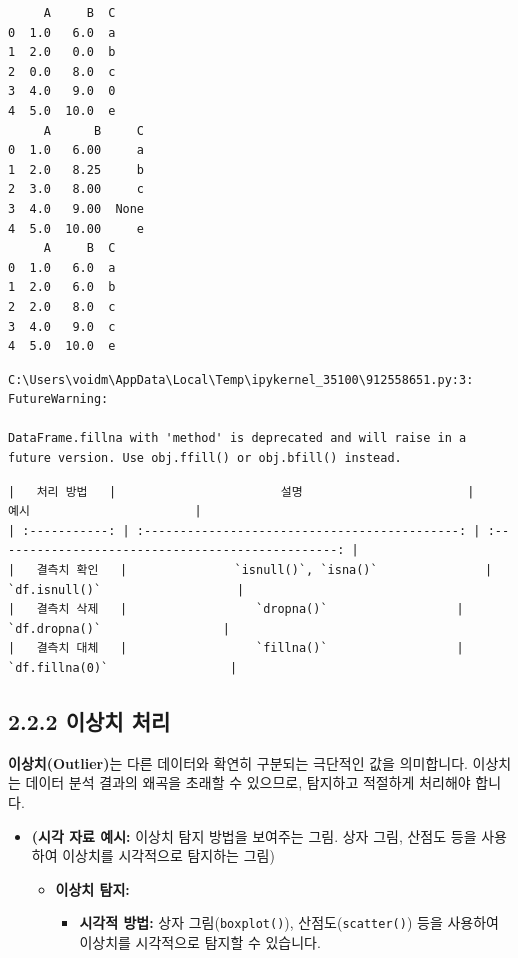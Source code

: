 \documentclass[
  letterpaper,
]{book}
\providecommand{\tightlist}{%
  \setlength{\itemsep}{0pt}\setlength{\parskip}{0pt}}
\begin{document}
\begin{verbatim}
     A     B  C
0  1.0   6.0  a
1  2.0   0.0  b
2  0.0   8.0  c
3  4.0   9.0  0
4  5.0  10.0  e
     A      B     C
0  1.0   6.00     a
1  2.0   8.25     b
2  3.0   8.00     c
3  4.0   9.00  None
4  5.0  10.00     e
     A     B  C
0  1.0   6.0  a
1  2.0   6.0  b
2  2.0   8.0  c
3  4.0   9.0  c
4  5.0  10.0  e
\end{verbatim}

\begin{verbatim}
C:\Users\voidm\AppData\Local\Temp\ipykernel_35100\912558651.py:3: FutureWarning:

DataFrame.fillna with 'method' is deprecated and will raise in a future version. Use obj.ffill() or obj.bfill() instead.
\end{verbatim}

\begin{verbatim}
|   처리 방법   |                       설명                       |                       예시                       |
| :-----------: | :--------------------------------------------: | :------------------------------------------------: |
|   결측치 확인   |               `isnull()`, `isna()`               |                   `df.isnull()`                   |
|   결측치 삭제   |                  `dropna()`                  |                 `df.dropna()`                 |
|   결측치 대체   |                  `fillna()`                  |                 `df.fillna(0)`                 |
\end{verbatim}

\subsection{2.2.2 이상치 처리}\label{uxc774uxc0c1uxce58-uxcc98uxb9ac}

\textbf{이상치(Outlier)}는 다른 데이터와 확연히 구분되는 극단적인 값을
의미합니다. 이상치는 데이터 분석 결과의 왜곡을 초래할 수 있으므로,
탐지하고 적절하게 처리해야 합니다.

\begin{itemize}
\item
  \textbf{(시각 자료 예시:} 이상치 탐지 방법을 보여주는 그림. 상자 그림,
  산점도 등을 사용하여 이상치를 시각적으로 탐지하는 그림)

  \begin{itemize}
  \tightlist
  \item
    \textbf{이상치 탐지:}

    \begin{itemize}
    \tightlist
    \item
      \textbf{시각적 방법:} 상자 그림(\texttt{boxplot()}),
      산점도(\texttt{scatter()}) 등을 사용하여 이상치를 시각적으로
      탐지할 수 있습니다.
    \end{itemize}
  \end{itemize}
\end{itemize}
\end{document}
